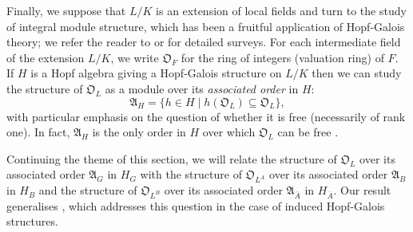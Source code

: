 \documentclass[12pt,a4paper, reqno]{amsart}
\theoremstyle{definition}
\def \O {\mathfrak{O}}
\def \A {\mathfrak{A}}
\begin{document}
Finally, we suppose that $ L/K $ is an extension of local fields and turn to the study of integral module structure, which has been a fruitful application of Hopf-Galois theory; we refer the reader to \cite{HAGMT} or \cite{TWE} for detailed surveys. For each intermediate field of the extension $ L/K $, we write $ \O_{F} $ for the ring of integers (valuation ring) of $ F $. If $ H $ is a Hopf algebra giving a Hopf-Galois structure on $ L/K $ then we can study the structure of $ \O_{L} $ as a module over its \textit{associated order} in $ H $:
\[ \A_{H} = \{ h \in H \mid h(\O_{L}) \subseteq \O_{L} \}, \]
with particular emphasis on the question of whether it is free (necessarily of rank one). In fact, $ \A_{H} $ is the only order in $ H $ over which $ \O_{L} $ can be free \cite[(12.5)]{TWE}. 

Continuing the theme of this section, we will relate the structure of $ \O_{L} $ over its associated order $ \A_{G} $ in $ H_{G} $ with the structure of $ \O_{L^{A}} $ over its associated order $ \A_{B} $ in $ H_{B} $ and the structure of $ \O_{L^{B}} $ over its associated order $ \A_{\overline{A}} $ in $ H_{\overline{A}} $. Our result generalises \cite[Theorem 5.16]{GR20}, which addresses this question in the case of induced Hopf-Galois structures.  
\end{document}
